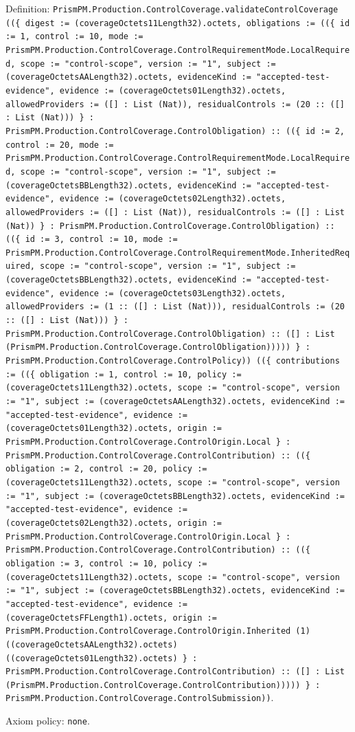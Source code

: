\documentclass[11pt]{article}
\begin{document}
\noindent Definition: \texttt{PrismPM.Production.ControlCoverage.validateControlCoverage ((\{ digest := (coverageOctets11Length32).octets, obligations := ((\{ id := 1, control := 10, mode := PrismPM.Production.ControlCoverage.ControlRequirementMode.LocalRequired, scope := "control-scope", version := "1", subject := (coverageOctetsAALength32).octets, evidenceKind := "accepted-test-evidence", evidence := (coverageOctets01Length32).octets, allowedProviders := ([] : List (Nat)), residualControls := (20 :: ([] : List (Nat))) \} : PrismPM.Production.ControlCoverage.ControlObligation) :: ((\{ id := 2, control := 20, mode := PrismPM.Production.ControlCoverage.ControlRequirementMode.LocalRequired, scope := "control-scope", version := "1", subject := (coverageOctetsBBLength32).octets, evidenceKind := "accepted-test-evidence", evidence := (coverageOctets02Length32).octets, allowedProviders := ([] : List (Nat)), residualControls := ([] : List (Nat)) \} : PrismPM.Production.ControlCoverage.ControlObligation) :: ((\{ id := 3, control := 10, mode := PrismPM.Production.ControlCoverage.ControlRequirementMode.InheritedRequired, scope := "control-scope", version := "1", subject := (coverageOctetsBBLength32).octets, evidenceKind := "accepted-test-evidence", evidence := (coverageOctets03Length32).octets, allowedProviders := (1 :: ([] : List (Nat))), residualControls := (20 :: ([] : List (Nat))) \} : PrismPM.Production.ControlCoverage.ControlObligation) :: ([] : List (PrismPM.Production.ControlCoverage.ControlObligation))))) \} : PrismPM.Production.ControlCoverage.ControlPolicy)) ((\{ contributions := ((\{ obligation := 1, control := 10, policy := (coverageOctets11Length32).octets, scope := "control-scope", version := "1", subject := (coverageOctetsAALength32).octets, evidenceKind := "accepted-test-evidence", evidence := (coverageOctets01Length32).octets, origin := PrismPM.Production.ControlCoverage.ControlOrigin.Local \} : PrismPM.Production.ControlCoverage.ControlContribution) :: ((\{ obligation := 2, control := 20, policy := (coverageOctets11Length32).octets, scope := "control-scope", version := "1", subject := (coverageOctetsBBLength32).octets, evidenceKind := "accepted-test-evidence", evidence := (coverageOctets02Length32).octets, origin := PrismPM.Production.ControlCoverage.ControlOrigin.Local \} : PrismPM.Production.ControlCoverage.ControlContribution) :: ((\{ obligation := 3, control := 10, policy := (coverageOctets11Length32).octets, scope := "control-scope", version := "1", subject := (coverageOctetsBBLength32).octets, evidenceKind := "accepted-test-evidence", evidence := (coverageOctetsFFLength1).octets, origin := PrismPM.Production.ControlCoverage.ControlOrigin.Inherited (1) ((coverageOctetsAALength32).octets) ((coverageOctets01Length32).octets) \} : PrismPM.Production.ControlCoverage.ControlContribution) :: ([] : List (PrismPM.Production.ControlCoverage.ControlContribution))))) \} : PrismPM.Production.ControlCoverage.ControlSubmission))}.\par
\noindent Axiom policy: \texttt{none}.\par
\end{document}
